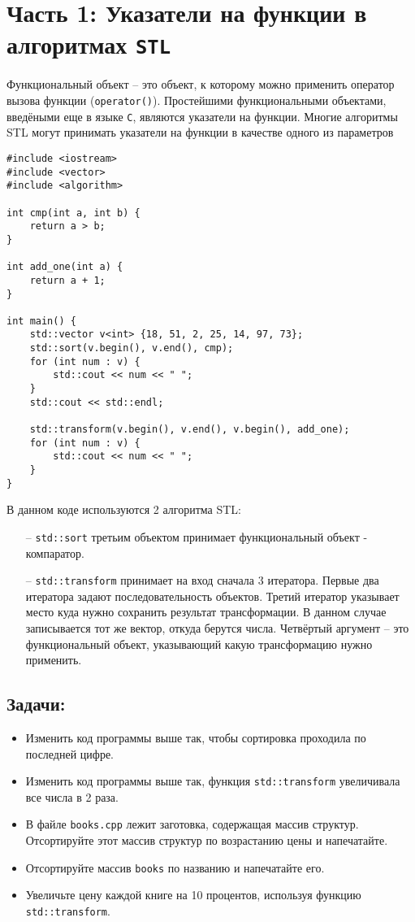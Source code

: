 \documentclass{article}
\begin{document}
\section*{Часть 1: Указатели на функции в алгоритмах \texttt{STL}}
Функциональный объект -- это объект, к которому можно применить оператор вызова функции (\texttt{operator()}). Простейшими функциональными объектами, введёными еще в языке \texttt{C}, являются указатели на функции.
Многие алгоритмы STL могут принимать указатели на функции в качестве одного из параметров
\begin{lstlisting}
#include <iostream>
#include <vector>
#include <algorithm>

int cmp(int a, int b) {
    return a > b;
}

int add_one(int a) {
    return a + 1;
}

int main() {
    std::vector v<int> {18, 51, 2, 25, 14, 97, 73};
    std::sort(v.begin(), v.end(), cmp);
    for (int num : v) {
        std::cout << num << " ";
    }    
    std::cout << std::endl;
    
    std::transform(v.begin(), v.end(), v.begin(), add_one);
    for (int num : v) {
        std::cout << num << " ";
    } 
}
\end{lstlisting}
В данном коде используются 2 алгоритма STL:
\begin{itemize}
\item[--] \texttt{std::sort} третьим объектом принимает функциональный объект - компаратор.
\item[--] \texttt{std::transform} принимает на вход сначала 3 итератора. Первые два итератора задают последовательность объектов. Третий итератор указывает место куда нужно сохранить результат трансформации. В данном случае записывается тот же вектор, откуда берутся числа. Четвёртый аргумент -- это функциональный объект, указывающий какую трансформацию нужно применить.
\end{itemize}

\subsection*{Задачи:}
\begin{itemize}
\item Изменить код программы выше так, чтобы сортировка проходила по последней цифре.
\item Изменить код программы выше так, функция \texttt{std::transform} увеличивала все числа в 2 раза.
\item В файле \texttt{books.cpp} лежит заготовка, содержащая массив структур. Отсортируйте этот массив структур по возрастанию цены и напечатайте.
\item Отсортируйте массив \texttt{books} по названию и напечатайте его.
\item Увеличьте цену каждой книге на 10 процентов, используя функцию \texttt{std::transform}.
\end{itemize}
\end{document}
